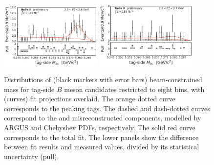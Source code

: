 \begin{figure}[htbp!]
    \includegraphics[width=0.45\textwidth]{fitting/plots/MbcFit_2p5to2p6_data_pub.pdf}
    \includegraphics[width=0.45\textwidth]{fitting/plots/MbcFit_2p6to2p7_data_pub.pdf}

    
    \caption{\label{fig:data_fits} Distributions of (black markers with error bars) beam-constrained mass for tag-side $B$ meson candidates restricted to eight \EB bins, with (curves) fit projections overlaid. The orange dotted curve corresponds to the \BB peaking tags. The dashed and dash-dotted curves correspond to the \qqbar and misreconstructed \BB components, modelled by ARGUS and Chebyshev PDFs, respectively. The solid red curve corresponds to the total fit. The lower panels show the difference between fit results and measured values, divided by its statistical uncertainty (pull).}
    \label{fig:mbc_split_fits}
\end{figure}



